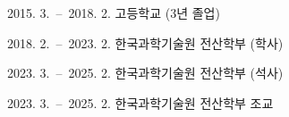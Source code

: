 \documentclass[master,english,draft]{kaist-ucs} %
\begin{document}


















\acknowledgment[4]

\curriculumvitae[4]

  \begin{personaldata}
  \end{personaldata}

  \begin{education}
    \item[2015. 3.\ --\ 2018. 2.] 고등학교 (3년 졸업)
    \item[2018. 2.\ --\ 2023. 2.] 한국과학기술원 전산학부 (학사)
    \item[2023. 3.\ --\ 2025. 2.] 한국과학기술원 전산학부 (석사)
  \end{education}

  \begin{career}
    \item[2023. 3.\ --\ 2025. 2.] 한국과학기술원 전산학부 조교
  \end{career}
\end{document}
